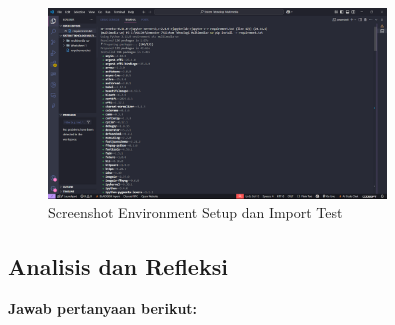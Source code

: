\documentclass[11pt,a4paper]{article}
\begin{document}
\begin{figure}[h!]
\centering
\includegraphics[width=0.8\textwidth]{figure/env.png}
\caption{Screenshot Environment Setup dan Import Test}
\label{fig:environment}
\end{figure}

\subsection{Analisis dan Refleksi}
\textbf{Jawab pertanyaan berikut:}
\end{document}
